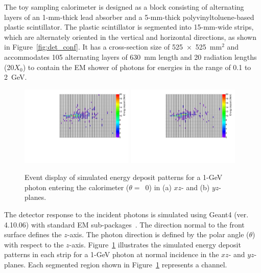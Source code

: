 \documentclass[12pt,times,draftclsnofoot,a4paper]{elsarticle}
\begin{document}
The toy sampling calorimeter is designed as a block consisting of alternating layers of an 1-mm-thick lead absorber and a 5-mm-thick polyvinyltoluene-based plastic scintillator. The plastic scintillator is segmented into 15-mm-wide strips, which are alternately oriented in the vertical and horizontal directions, as shown in Figure~\ref{fig:det_conf}. It has a cross-section size of 525~$\times$~525~mm$^{2}$ and accommodates 105 alternating layers of 630~mm length and 20 radiation lengths (20$X_{0}$) to contain the EM shower of photons for energies in the range of 0.1 to 2~GeV.

\begin{figure}[!hbt]
\centering
\includegraphics[width=0.48\textwidth]{Fig2_EMShower_XZ.pdf}
\includegraphics[width=0.48\textwidth]{Fig2_EMShower_YZ.pdf}
\caption{ Event display of simulated energy deposit patterns for a 1-GeV photon entering the calorimeter ($\theta=$~0) in (a) $xz$- and (b) $yz$-planes.}
\label{fig:Evt_Dis}
\end{figure}

The detector response to the incident photons is simulated using Geant4 (ver. 4.10.06) with standard EM sub-packages~\cite{GEANT4}. The direction normal to the front surface defines the $z$-axis. The photon direction is defined by the polar angle ($\theta$) with respect to the $z$-axis. Figure~\ref{fig:Evt_Dis} illustrates the simulated energy deposit patterns in each strip for a 1-GeV photon at normal incidence in the $xz$- and $yz$-planes. Each segmented region shown in Figure~\ref{fig:Evt_Dis} represents a channel. 
\end{document}

